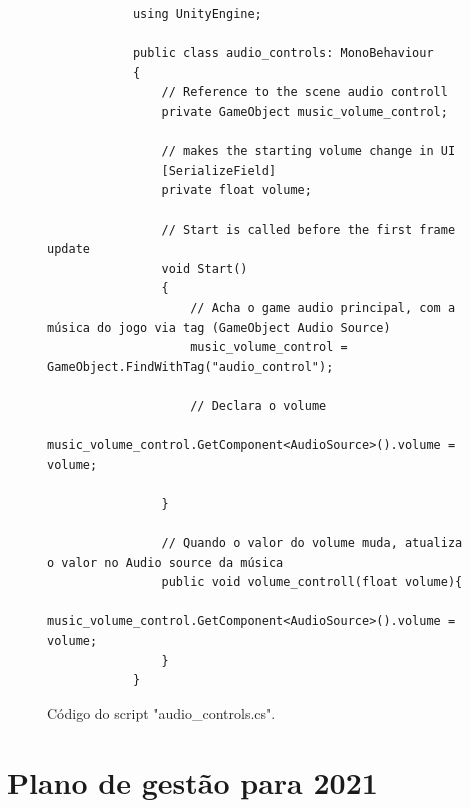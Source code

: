     \begin{figure}[ht!]
        \centering
        \begin{lstlisting}
            using UnityEngine;

            public class audio_controls: MonoBehaviour
            {
                // Reference to the scene audio controll 
                private GameObject music_volume_control;

                // makes the starting volume change in UI
                [SerializeField]
                private float volume;

                // Start is called before the first frame update
                void Start()
                {
                    // Acha o game audio principal, com a música do jogo via tag (GameObject Audio Source)
                    music_volume_control = GameObject.FindWithTag("audio_control");
                    
                    // Declara o volume 
                    music_volume_control.GetComponent<AudioSource>().volume = volume;

                }

                // Quando o valor do volume muda, atualiza o valor no Audio source da música
                public void volume_controll(float volume){
                    music_volume_control.GetComponent<AudioSource>().volume = volume;
                }
            }

        \end{lstlisting}
        \caption{Código do script "audio\_controls.cs".}
        \label{code:audiocontrol}

    \end{figure}



\chapter{Plano de gestão para 2021}

\newpage

